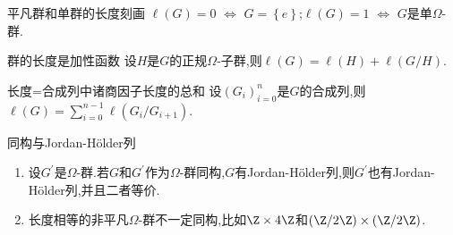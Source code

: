 \begin{corollary}{平凡群和单群的长度刻画}{}
	$\ell\left(G\right)=0$ $\iff$ $G=\left\{e\right\}$;$\ell\left(G\right)=1$ $\iff$ $G$是单$\Omega$-群.
\end{corollary}

\begin{proposition}{群的长度是加性函数}{}
	设$H$是$G$的正规$\Omega$-子群,则$\ell\left(G\right)=\ell\left(H\right)+\ell\left(G/H\right)$.
\end{proposition}

\begin{corollary}{长度=合成列中诸商因子长度的总和}{}
	设$\left(G_{i}\right)_{i=0}^{n}$是$G$的合成列,则$\ell\left(G\right)=\sum\limits_{i=0}^{n-1}\ell\left(G_{i}/G_{i+1}\right)$.
\end{corollary}

\begin{remark}{同构与Jordan-H\"older列}{}
	\begin{enumerate}
		\item 设$G^{\prime}$是$\Omega$-群.若$G$和$G^{\prime}$作为$\Omega$-群同构,$G$有Jordan-H\"older列,则$G^{\prime}$也有Jordan-H\"older列,并且二者等价.
		\item 长度相等的非平凡$\Omega$-群不一定同构,比如$\Z\times 4\Z$和$\left(\Z/2\Z\right)\times\left(\Z/2\Z\right)$.
	\end{enumerate}
\end{remark}











































